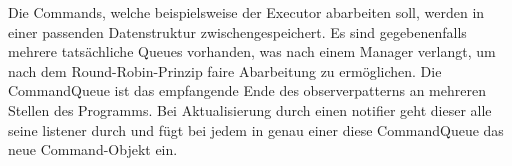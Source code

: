       \medskip
      Die Commands, welche beispielsweise der Executor abarbeiten soll, werden in
      einer passenden Datenstruktur zwischengespeichert. Es sind gegebenenfalls mehrere
      tatsächliche Queues vorhanden, was nach einem Manager verlangt, um nach dem
      Round-Robin-Prinzip faire Abarbeitung zu ermöglichen. Die CommandQueue
      ist das empfangende Ende des \gls{observerpattern}s an mehreren Stellen des
      Programms. Bei Aktualisierung durch einen \gls{notifier} geht dieser alle
      seine \gls{listener} durch und fügt bei jedem in genau einer diese
      CommandQueue das neue Command-Objekt ein.